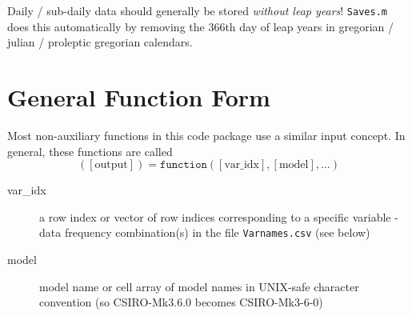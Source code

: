 \documentclass{article}
\begin{document}
Daily / sub-daily data should generally be stored \textit{without leap years}! \texttt{Saves.m} does this automatically by removing the 366th day of leap years in gregorian / julian / proleptic gregorian calendars. 

\section{General Function Form} %
Most non-auxiliary functions in this code package use a similar input concept. In general, these functions are called 
\begin{equation}
([\text{output}]) = \texttt{function}([\text{var\_idx}],[\text{model}],\dots)
\end{equation}

\begin{description}
\item [var\_idx] a row index or vector of row indices corresponding to a specific variable - data frequency combination(s) in the file \texttt{Varnames.csv} (see below)
\item [model] model name or cell array of model names in UNIX-safe character convention (so CSIRO-Mk3.6.0 becomes CSIRO-Mk3-6-0)
\end{description}
\end{document}
